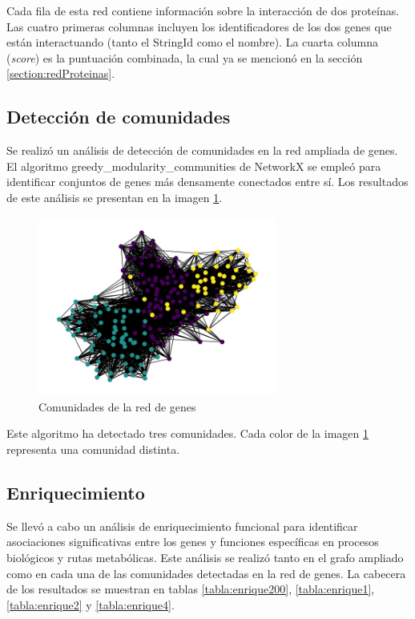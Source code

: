 Cada fila de esta red contiene información sobre la interacción de dos proteínas. Las cuatro primeras columnas incluyen los identificadores de los dos genes que están interactuando (tanto el StringId como el nombre). La cuarta columna (\textit{score}) es la puntuación combinada, la cual ya se mencionó en la sección \ref{section:redProteinas}.


\subsection{Detección de comunidades}

Se realizó un análisis de detección de comunidades en la red ampliada de genes. El algoritmo greedy\_modularity\_communities de NetworkX se empleó para identificar conjuntos de genes más densamente conectados entre sí. Los resultados de este análisis se presentan en la imagen \ref{fig:comunidades}.

\begin{figure}[h!]
	\centering
	\includegraphics[width=0.7\textwidth]{../results/graph_communities.png}
	\caption{Comunidades de la red de genes}
	\label{fig:comunidades}
\end{figure}

Este algoritmo ha detectado tres comunidades. Cada color de la imagen \ref{fig:comunidades} representa una comunidad distinta.

\subsection{Enriquecimiento}

Se llevó a cabo un análisis de enriquecimiento funcional para identificar asociaciones significativas entre los genes y funciones específicas en procesos biológicos y rutas metabólicas. Este análisis se realizó tanto en el grafo ampliado como en cada una de las comunidades detectadas en la red de genes. La cabecera de los resultados se muestran en tablas \ref{tabla:enrique200}, \ref{tabla:enrique1}, \ref{tabla:enrique2} y \ref{tabla:enrique4}.

